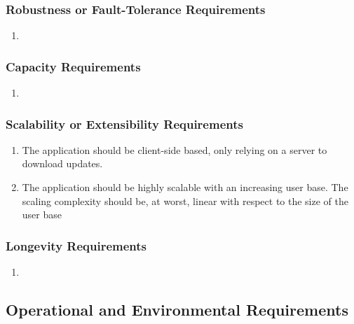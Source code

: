 \documentclass[]{article}
\begin{document}
\subsubsection{Robustness or Fault-Tolerance Requirements}
\label{ssub:robustness_or_fault_tolerance_requirements}
\begin{enumerate}[{PR}1. ]
	\item 
\end{enumerate}

\subsubsection{Capacity Requirements}
\label{ssub:capacity_requirements}
\begin{enumerate}[{PR}1. ]
	\item 
\end{enumerate}

\subsubsection{Scalability or Extensibility Requirements}
\label{ssub:scalability_or_extensibility_requirements}
\begin{enumerate}[{PR}1. ]
	\item The application should be client-side based, only relying on a server to download updates.
	\item The application should be highly scalable with an increasing user base. The scaling complexity should be, at worst, linear with respect to the size of the user base
\end{enumerate}

\subsubsection{Longevity Requirements}
\label{ssub:longevity_requirements}
\begin{enumerate}[{PR}1. ]
	\item 
\end{enumerate}


\subsection{Operational and Environmental Requirements}
\label{sub:operational_and_environmental_requirements}
\end{document}
